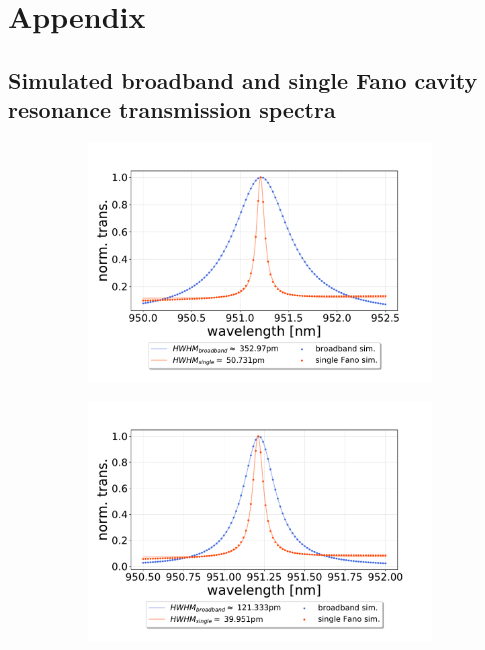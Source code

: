 \appendix
\section*{Appendix}
\renewcommand{\thesubsection}{\Alph{subsection}}

\subsection{Simulated broadband and single Fano cavity resonance transmission spectra}

\begin{figure}[h!]
    \centering
    \begin{subfigure}[b]{0.49\textwidth}
        \includegraphics[width=\textwidth]{figures/sim_single_vs_broadband_10um.pdf}
        \caption{}
        \label{fig:single_vs_broadband_simulation_10um}
    \end{subfigure}
    \begin{subfigure}[b]{0.49\textwidth}
        \includegraphics[width=\textwidth]{figures/sim_single_vs_broadband_30um.pdf}

\end{subfigure}
\end{figure}
